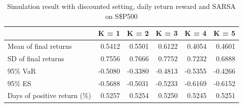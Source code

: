 \documentclass{article}
\begin{document}
\begin{table}[H]
\centering
\begin{tabular}{|l|r|r|r|r|r|} 
\hline
                             & \multicolumn{1}{l|}{K = 1} & \multicolumn{1}{l|}{K = 2} & \multicolumn{1}{l|}{K = 3} & \multicolumn{1}{l|}{K = 4} & \multicolumn{1}{l|}{K = 5}  \\ 
\hline
Mean of final returns        & 0.5412                     & 0.5501                     & 0.6122                     & 0.4054                     & 0.4601                      \\ 
\hline
SD of final returns          & 0.7556                     & 0.7666                     & 0.7752                     & 0.7232                     & 0.6888                      \\ 
\hline
95\% VaR                     & -0.5080                    & -0.3380                    & -0.4813                    & -0.5355                    & -0.4266                     \\ 
\hline
95\% ES                      & -0.5688                    & -0.5031                    & -0.5233                    & -0.6169                    & -0.6152                     \\ 
\hline
Days of positive return (\%) & 0.5257                     & 0.5254                     & 0.5250                     & 0.5245                     & 0.5251                      \\
\hline
\end{tabular}
\caption{Simulation result with discounted setting, daily return reward and SARSA on S\$P500}
\label{table17}
\end{table}
\end{document}
